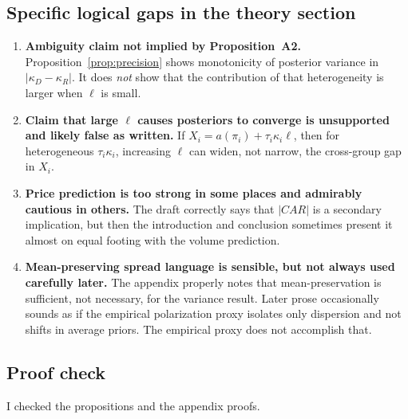 \documentclass[11pt]{article}
\begin{document}
\subsection*{Specific logical gaps in the theory section}
\begin{enumerate}
    \item \textbf{Ambiguity claim not implied by Proposition~A2.} Proposition~\ref{prop:precision} shows monotonicity of posterior variance in $|\kappa_D-\kappa_R|$. It does \emph{not} show that the contribution of that heterogeneity is larger when $\ell$ is small.
    \item \textbf{Claim that large $\ell$ causes posteriors to converge is unsupported and likely false as written.} If $X_i=a(\pi_i)+\tau_i\kappa_i\ell$, then for heterogeneous $\tau_i\kappa_i$, increasing $\ell$ can widen, not narrow, the cross-group gap in $X_i$.
    \item \textbf{Price prediction is too strong in some places and admirably cautious in others.} The draft correctly says that $|CAR|$ is a secondary implication, but then the introduction and conclusion sometimes present it almost on equal footing with the volume prediction.
    \item \textbf{Mean-preserving spread language is sensible, but not always used carefully later.} The appendix properly notes that mean-preservation is sufficient, not necessary, for the variance result. Later prose occasionally sounds as if the empirical polarization proxy isolates only dispersion and not shifts in average priors. The empirical proxy does not accomplish that.
\end{enumerate}

\subsection*{Proof check}
I checked the propositions and the appendix proofs.
\end{document}
